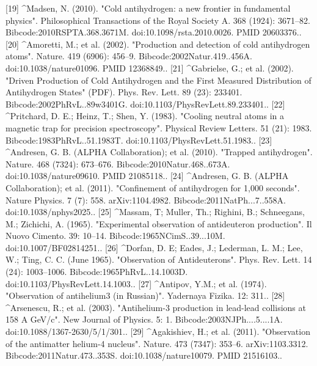 [19]
^Madsen, N. (2010). "Cold antihydrogen: a new frontier in fundamental physics". Philosophical Transactions of the Royal Society A. 368 (1924): 3671–82. Bibcode:2010RSPTA.368.3671M. doi:10.1098/rsta.2010.0026. PMID 20603376..
[20]
^Amoretti, M.; et al. (2002). "Production and detection of cold antihydrogen atoms". Nature. 419 (6906): 456–9. Bibcode:2002Natur.419..456A. doi:10.1038/nature01096. PMID 12368849..
[21]
^Gabrielse, G.; et al. (2002). "Driven Production of Cold Antihydrogen and the First Measured Distribution of Antihydrogen States" (PDF). Phys. Rev. Lett. 89 (23): 233401. Bibcode:2002PhRvL..89w3401G. doi:10.1103/PhysRevLett.89.233401..
[22]
^Pritchard, D. E.; Heinz, T.; Shen, Y. (1983). "Cooling neutral atoms in a magnetic trap for precision spectroscopy". Physical Review Letters. 51 (21): 1983. Bibcode:1983PhRvL..51.1983T. doi:10.1103/PhysRevLett.51.1983..
[23]
^Andresen, G. B. (ALPHA Collaboration); et al. (2010). "Trapped antihydrogen". Nature. 468 (7324): 673–676. Bibcode:2010Natur.468..673A. doi:10.1038/nature09610. PMID 21085118..
[24]
^Andresen, G. B. (ALPHA Collaboration); et al. (2011). "Confinement of antihydrogen for 1,000 seconds". Nature Physics. 7 (7): 558. arXiv:1104.4982. Bibcode:2011NatPh...7..558A. doi:10.1038/nphys2025..
[25]
^Massam, T; Muller, Th.; Righini, B.; Schneegans, M.; Zichichi, A. (1965). "Experimental observation of antideuteron production". Il Nuovo Cimento. 39: 10–14. Bibcode:1965NCimS..39...10M. doi:10.1007/BF02814251..
[26]
^Dorfan, D. E; Eades, J.; Lederman, L. M.; Lee, W.; Ting, C. C. (June 1965). "Observation of Antideuterons". Phys. Rev. Lett. 14 (24): 1003–1006. Bibcode:1965PhRvL..14.1003D. doi:10.1103/PhysRevLett.14.1003..
[27]
^Antipov, Y.M.; et al. (1974). "Observation of antihelium3 (in Russian)". Yadernaya Fizika. 12: 311..
[28]
^Arsenescu, R.; et al. (2003). "Antihelium-3 production in lead-lead collisions at 158 A GeV/c". New Journal of Physics. 5: 1. Bibcode:2003NJPh....5....1A. doi:10.1088/1367-2630/5/1/301..
[29]
^Agakishiev, H.; et al. (2011). "Observation of the antimatter helium-4 nucleus". Nature. 473 (7347): 353–6. arXiv:1103.3312. Bibcode:2011Natur.473..353S. doi:10.1038/nature10079. PMID 21516103..